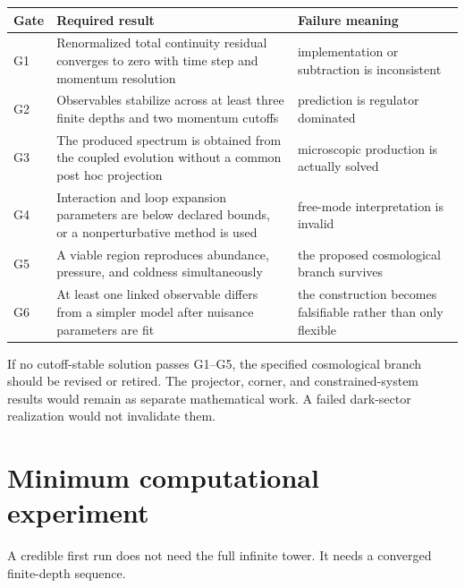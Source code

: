 \begin{longtable}{@{}P{0.13\textwidth}P{0.35\textwidth}P{0.42\textwidth}@{}}
\toprule
Gate & Required result & Failure meaning\\
\midrule
G1 & Renormalized total continuity residual converges to zero with time step and momentum resolution & implementation or subtraction is inconsistent\\
G2 & Observables stabilize across at least three finite depths and two momentum cutoffs & prediction is regulator dominated\\
G3 & The produced spectrum is obtained from the coupled evolution without a common post hoc projection & microscopic production is actually solved\\
G4 & Interaction and loop expansion parameters are below declared bounds, or a nonperturbative method is used & free-mode interpretation is invalid\\
G5 & A viable region reproduces abundance, pressure, and coldness simultaneously & the proposed cosmological branch survives\\
G6 & At least one linked observable differs from a simpler model after nuisance parameters are fit & the construction becomes falsifiable rather than only flexible\\
\bottomrule
\end{longtable}

\begin{negativebox}[Go or revise]
If no cutoff-stable solution passes G1--G5, the specified cosmological branch should be revised or retired.  The projector, corner, and constrained-system results would remain as separate mathematical work.  A failed dark-sector realization would not invalidate them.
\end{negativebox}

\section{Minimum computational experiment}

A credible first run does not need the full infinite tower.  It needs a converged finite-depth sequence.

